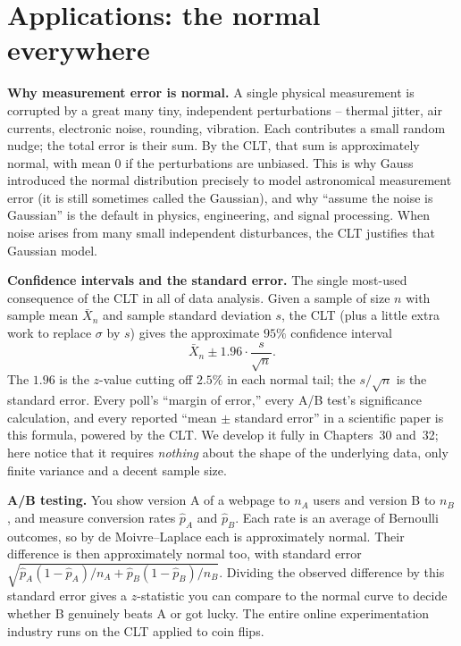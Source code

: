 \section{Applications: the normal everywhere}
\label{ch21:applications}

\begin{applicationbox}
\textbf{Why measurement error is normal.} A single physical measurement is corrupted by
a great many tiny, independent perturbations -- thermal jitter, air currents, electronic
noise, rounding, vibration. Each contributes a small random nudge; the total error is
their sum. By the CLT, that sum is approximately normal, with mean $0$ if the
perturbations are unbiased. This is why Gauss introduced the normal distribution
precisely to model astronomical measurement error (it is still sometimes called the
Gaussian), and why ``assume the noise is Gaussian'' is the default in physics,
engineering, and signal processing. When noise arises from many small independent disturbances, the CLT justifies that Gaussian model.
\end{applicationbox}

\begin{applicationbox}
\textbf{Confidence intervals and the standard error.} The single most-used consequence
of the CLT in all of data analysis. Given a sample of size $n$ with sample mean
$\bar X_n$ and sample standard deviation $s$, the CLT (plus a little extra work to
replace $\sigma$ by $s$) gives the approximate $95\%$ confidence interval
\[
  \bar X_n \pm 1.96 \cdot \frac{s}{\sqrt n}.
\]
The $1.96$ is the $z$-value cutting off $2.5\%$ in each normal tail; the $s/\sqrt n$ is
the standard error. Every poll's ``margin of error,'' every A/B test's significance
calculation, and every reported ``mean $\pm$ standard error'' in a scientific paper is
this formula, powered by the CLT. We develop it fully in Chapters~30 and~32; here notice that it requires \emph{nothing} about the
shape of the underlying data, only finite variance and a decent sample size.
\end{applicationbox}

\begin{applicationbox}
\textbf{A/B testing.} You show version A of a webpage to $n_A$ users and version B to
$n_B$, and measure conversion rates $\hat p_A$ and $\hat p_B$. Each rate is an average
of Bernoulli outcomes, so by de Moivre--Laplace each is approximately normal. Their
difference is then approximately normal too, with standard error
$\sqrt{\hat p_A(1-\hat p_A)/n_A + \hat p_B(1-\hat p_B)/n_B}$. Dividing the observed
difference by this standard error gives a $z$-statistic you can compare to the normal
curve to decide whether B genuinely beats A or got lucky. The entire online
experimentation industry runs on the CLT applied to coin flips.
\end{applicationbox}

